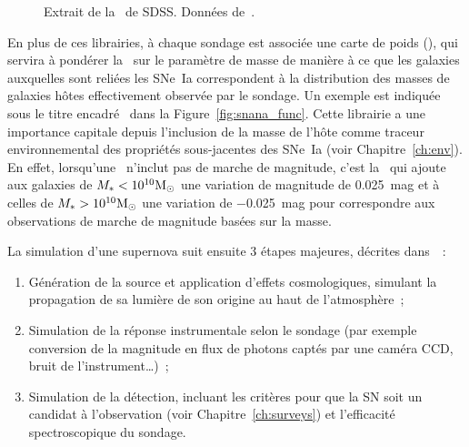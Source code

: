 \documentclass[../main/main.tex]{subfiles}
\begin{document}
\begin{figure}[ht]
    \centering
    \begin{minipage}{0.75\linewidth}
    \end{minipage}
    \caption[Extrait de la \simlib\ de SDSS]{Extrait de la \simlib\ de SDSS.
    Données de~\cite{kessler2013}.}
    \label{fig:sdssimlib}
\end{figure}

En plus de ces librairies, à chaque sondage est associée une carte de poids
(\wgtmap), qui servira à pondérer la \hostlib\ sur le paramètre de masse de
manière à ce que les galaxies auxquelles sont reliées les SNe~Ia correspondent à
la distribution des masses de galaxies hôtes effectivement observée par le
sondage. Un exemple est indiquée sous le titre encadré \wgtmap\ dans la
Figure~\ref{fig:snana_func}. Cette librairie a une importance capitale depuis
l'inclusion de la masse de l'hôte comme traceur environnemental des propriétés
sous-jacentes des SNe~Ia (voir Chapitre~\ref{ch:env}). En effet, lorsqu'une
\hostlib\ n'inclut pas de marche de magnitude, c'est la \wgtmap\ qui ajoute aux
galaxies de $M_* < 10^{10}\si{\Msun}$ une variation de magnitude de
\SI{0.025}{mag} et à celles de $M_* > 10^{10}\si{\Msun}$ une variation de
\SI{-0.025}{mag} pour correspondre aux observations de marche de magnitude
basées sur la masse.

La simulation d'une supernova suit ensuite 3 étapes majeures, décrites
dans~\cite{kessler2019}~:
\begin{enumerate}
    \item Génération de la source et application d'effets cosmologiques,
        simulant la propagation de sa lumière de son origine au haut de
        l'atmosphère~;
    \item Simulation de la réponse instrumentale selon le sondage (par exemple
        conversion de la magnitude en flux de photons captés par une caméra CCD,
        bruit de l'instrument…)~;
    \item Simulation de la détection, incluant les critères pour que la SN soit
        un candidat à l'observation (voir Chapitre~\ref{ch:surveys}) et
        l'efficacité spectroscopique du sondage.
\end{enumerate}
\end{document}
